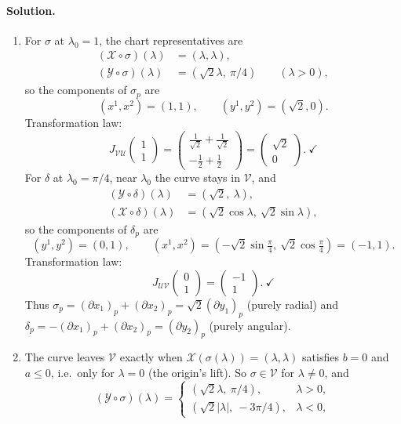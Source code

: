 \documentclass[11pt]{article}
\begin{document}
\paragraph{Solution.}
\begin{enumerate}[label=(\alph*)]
\item For $\sigma$ at $\lambda_0=1$, the chart representatives are
\begin{align*}
(\mathcal X\circ\sigma)(\lambda)&=(\lambda,\lambda),\\
(\mathcal Y\circ\sigma)(\lambda)&=(\sqrt2\lambda,\ \pi/4)\qquad(\lambda>0),
\end{align*}
so the components of $\sigma_p$ are
\[
(x^1,x^2)=(1,1),\qquad(y^1,y^2)=(\sqrt2,0).
\]
Transformation law:
\[
J_{\mathcal{VU}}\begin{pmatrix}1\\1\end{pmatrix}=\begin{pmatrix}\tfrac1{\sqrt2}+\tfrac1{\sqrt2}\\-\tfrac12+\tfrac12\end{pmatrix}=\begin{pmatrix}\sqrt2\\0\end{pmatrix}.\ \checkmark
\]
For $\delta$ at $\lambda_0=\pi/4$, near $\lambda_0$ the curve stays in $\mathcal V$, and
\begin{align*}
(\mathcal Y\circ\delta)(\lambda)&=(\sqrt2,\ \lambda),\\
(\mathcal X\circ\delta)(\lambda)&=(\sqrt2\cos\lambda,\ \sqrt2\sin\lambda),
\end{align*}
so the components of $\delta_p$ are
\[
(y^1,y^2)=(0,1),\qquad(x^1,x^2)=(-\sqrt2\sin\tfrac\pi4,\ \sqrt2\cos\tfrac\pi4)=(-1,1).
\]
Transformation law:
\[
J_{\mathcal{UV}}\begin{pmatrix}0\\1\end{pmatrix}=\begin{pmatrix}-1\\1\end{pmatrix}.\ \checkmark
\]
Thus $\sigma_p=(\partial x_1)_p+(\partial x_2)_p=\sqrt2(\partial y_1)_p$ (purely radial) and $\delta_p=-(\partial x_1)_p+(\partial x_2)_p=(\partial y_2)_p$ (purely angular).
\item The curve leaves $\mathcal V$ exactly when $\mathcal X(\sigma(\lambda))=(\lambda,\lambda)$ satisfies $b=0$ and $a\le0$, i.e.\ only for $\lambda=0$ (the origin's lift).
So $\sigma\in\mathcal V$ for $\lambda\neq0$, and
\[
(\mathcal Y\circ\sigma)(\lambda)=\begin{cases}(\sqrt2\lambda,\ \pi/4),&\lambda>0,\\ (\sqrt2|\lambda|,\ -3\pi/4),&\lambda<0,\end{cases}
\]
\end{enumerate}
\end{document}
